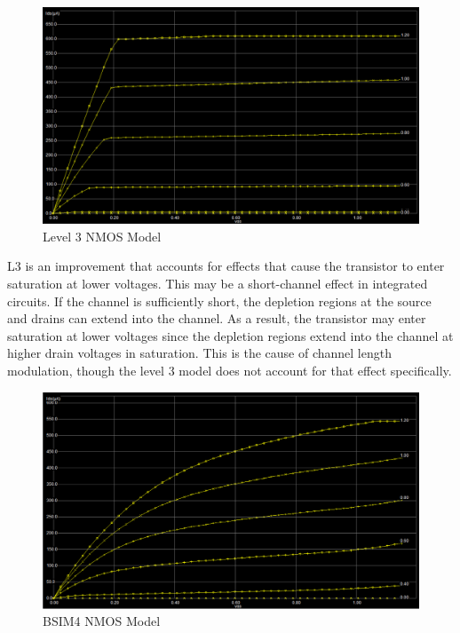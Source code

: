 \FloatBarrier

\begin{figure}[h!]
	\centering
	\includegraphics[scale=0.75]{../images/l3_mos.PNG}
	\caption{Level 3 NMOS Model}
	\label{fig:l3_mos}
\end{figure}

\FloatBarrier

L3 is an improvement that accounts for effects that cause the transistor to enter saturation at lower voltages.
This may be a short-channel effect in integrated circuits.
If the channel is sufficiently short, the depletion regions at the source and drains can extend into the channel.
As a result, the transistor may enter saturation at lower voltages since the depletion regions extend into the channel at higher drain voltages in saturation.
This is the cause of channel length modulation, though the level 3 model does not account for that effect specifically.

\FloatBarrier

\begin{figure}[h!]
	\centering
	\includegraphics[scale=0.75]{../images/bsim4_mos.PNG}
	\caption{BSIM4 NMOS Model}
	\label{fig:bsim4_mos}
\end{figure}


